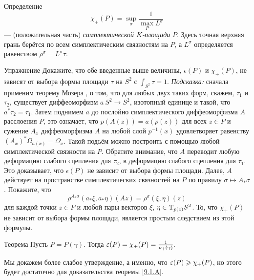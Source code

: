 \begin{ex*}{Определение}
\[\chi_+ (P) = \sup_\sigma \frac1{\max_P L^\sigma}\]  — (положительная часть) \emph{симплектической $K$-площади} $P$.
Здесь точная верхняя грань берётся по всем симплектическим связностям на $P$, а $L^\sigma$ определяется равенством $\rho^\sigma = L^\sigma \tau$.
\end{ex*}

\begin{ex*}{Упражнение}
Докажите, что обе введенные выше величины, $\epsilon(P)$ и $\chi_+
(P)$, не зависят от выбора формы площади $\tau$ на $S^2$ с $\int_{S^2}
\tau = 1$. 
\emph{Подсказка:} сначала применим теорему Мозера \cite{MS}, о том, что для
любых двух таких форм, скажем, $\tau_1$ и $\tau_2$, существует
диффеоморфизм $a\:S^2\to S^2$, изотопный единице и такой, что $a^\ast
\tau_2 = \tau_1$.
Затем поднимем $a$ до послойно симплектического диффеоморфизма $A$ расслоения $P$, это означает, что $p(A(z)) = a(p(z))$ для всех $z \in P$ и сужение $A_x$ диффеоморфизма $A$ на любой слой $p^{-1} (x)$ удовлетворяет равенству $(A_x)^\ast \Omega_{a(x)} = \Omega_x$.
Такой подъём можно построить с помощью любой симплектической связности
на $P$. 
Обратите внимание, что $A$ переводит любую деформацию слабого
сцепления для $\tau_2$, в деформацию слабого сцепления для
$\tau_1$.
Это доказывает, что $\epsilon(P)$ не зависит от выбора формы площади.
Далее, $A$ действует на пространстве симплектических связностей на $P$
по правилу $\sigma \mapsto A_\ast \sigma$.
Покажите, что 
\[\rho^{A_\ast \sigma} (a_\ast \xi, a_\ast \eta)(Az) = \rho^\sigma (\xi, \eta)(z)\]
для каждой точки $z \in P$ и любой пары векторов $\xi$, $\eta \in
\mathrm{T}_{p(z)} S^2$.
То, что $\chi_+(P)$ не зависит от выбора формы площади, является
простым следствием из этой формулы.
\end{ex*}

\begin{thm}[(\cite{P4})]{Теорема}\label{9.3.B}
  Пусть $P = P(\gamma)$.
  Тогда $\epsilon(P) = \chi_+ (P) \z= \frac1{\nu_+(\gamma)}.$
\end{thm}

Мы докажем более слабое утверждение, а именно, что $\epsilon(P) \z\ge
\chi_+ (P)$, но этого будет достаточно для доказательства теоремы
\ref{9.1.A}.

